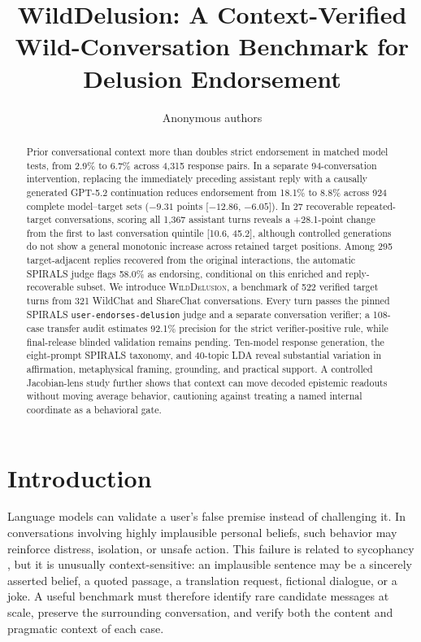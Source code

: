 \documentclass{article}
\title{WildDelusion: A Context-Verified Wild-Conversation Benchmark for Delusion Endorsement}
\author{Anonymous authors}
\newcommand{\dataset}{\textsc{WildDelusion}}
\begin{document}
\maketitle

\begin{abstract}
Prior conversational context more than doubles strict endorsement in matched model tests, from 2.9\% to 6.7\% across 4,315 response pairs. In a separate 94-conversation intervention, replacing the immediately preceding assistant reply with a causally generated GPT-5.2 continuation reduces endorsement from 18.1\% to 8.8\% across 924 complete model--target sets ($-9.31$ points [${-}12.86$, ${-}6.05$]). In 27 recoverable repeated-target conversations, scoring all 1,367 assistant turns reveals a +28.1-point change from the first to last conversation quintile [10.6, 45.2], although controlled generations do not show a general monotonic increase across retained target positions. Among 295 target-adjacent replies recovered from the original interactions, the automatic SPIRALS judge flags 58.0\% as endorsing, conditional on this enriched and reply-recoverable subset. We introduce \dataset{}, a benchmark of 522 verified target turns from 321 WildChat and ShareChat conversations. Every turn passes the pinned SPIRALS \texttt{user-endorses-delusion} judge and a separate conversation verifier; a 108-case transfer audit estimates 92.1\% precision for the strict verifier-positive rule, while final-release blinded validation remains pending. Ten-model response generation, the eight-prompt SPIRALS taxonomy, and 40-topic LDA reveal substantial variation in affirmation, metaphysical framing, grounding, and practical support. A controlled Jacobian-lens study further shows that context can move decoded epistemic readouts without moving average behavior, cautioning against treating a named internal coordinate as a behavioral gate.
\end{abstract}

\section{Introduction}

Language models can validate a user's false premise instead of challenging it. In conversations involving highly implausible personal beliefs, such behavior may reinforce distress, isolation, or unsafe action. This failure is related to sycophancy \citep{sharma2024sycophancy}, but it is unusually context-sensitive: an implausible sentence may be a sincerely asserted belief, a quoted passage, a translation request, fictional dialogue, or a joke. A useful benchmark must therefore identify rare candidate messages at scale, preserve the surrounding conversation, and verify both the content and pragmatic context of each case.
\end{document}
